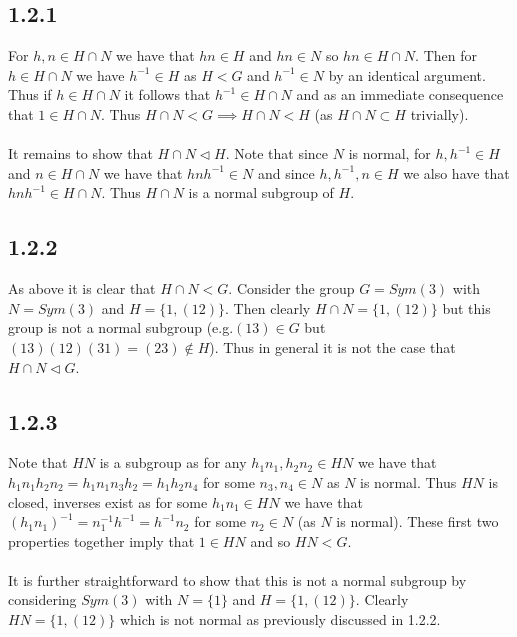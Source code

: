 \documentclass{article}
\begin{document}
\subsection*{1.2.1}
For $h,n \in H \cap N$ we have that $hn \in H$ and $hn \in N$ so $hn \in H \cap N$. Then for 
$h \in H \cap N$ we have $h^{-1} \in H$ as $H < G$ and $h^{-1} \in N$ by an identical argument. 
Thus if $h \in H \cap N$ it follows that $h^{-1} \in H \cap N$ and as an immediate consequence that 
$1 \in H \cap N$. Thus $H\cap N < G \implies H \cap N < H$ (as $H \cap N \subset H$ trivially). 

\paragraph{}
It remains to show that $H \cap N \triangleleft H$. Note that since $N$ is normal, for 
$h,h^{-1} \in H$ and $n \in H \cap N$ we have that $hnh^{-1} \in N$ and since $h,h^{-1},n \in H$ 
we also have that $hnh^{-1} \in H \cap N$. Thus $H \cap N$ is a normal subgroup of $H$.

\subsection*{1.2.2}
As above it is clear that $H \cap N < G$. Consider the group $ G = Sym(3)$ with $N = Sym(3)$ and 
$H = \{1, (12)\}$. Then clearly $H \cap N = \{1, (12)\}$ but this group is not a normal 
subgroup (e.g.$(13) \in G$ but $(13)(12)(31) = (23) \notin H$). Thus in general it is not the case that $H \cap N \triangleleft G$.

\subsection*{1.2.3}
Note that $HN$ is a subgroup as for any $h_1n_1,h_2n_2 \in HN$ we have that $h_1n_1h_2n_2 = h_1n_1n_3h_2 = h_1h_2n_4$ 
for some $n_3,n_4 \in N$ as $N$ is normal. Thus $HN$ is closed, inverses exist as for some $h_1n_1 \in HN$ we have that 
$(h_1n_1)^{-1} = n_1^{-1}h^{-1} = h^{-1}n_2$ for some $n_2 \in N$ (as $N$ is normal). These first two properties together 
imply that $1 \in HN$ and so $HN < G$. 

\paragraph{}
It is further straightforward to show that this is not a normal subgroup by considering $Sym(3)$ with 
$N = \{1\}$ and $H = \{1,(12)\}$. Clearly $HN = \{1,(12)\}$ which is not normal as previously discussed in 1.2.2.
\end{document}
